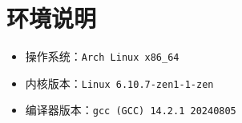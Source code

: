 \section{环境说明}

\begin{itemize}
    \item 操作系统：{\tt Arch Linux x86_64}
    \item 内核版本：{\tt Linux 6.10.7-zen1-1-zen}
    \item 编译器版本：{\tt gcc (GCC) 14.2.1 20240805}
\end{itemize}

